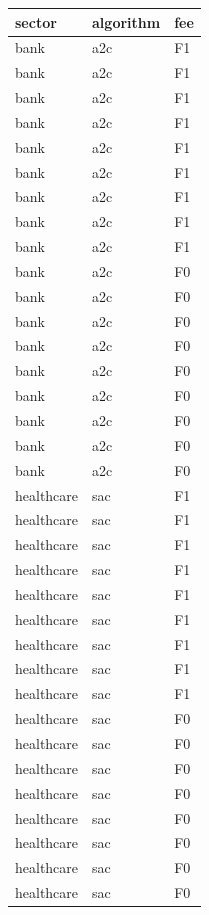 \begin{tabular}{lll}
\toprule
    sector & algorithm & fee \\
\midrule
      bank &       a2c &  F1 \\
      bank &       a2c &  F1 \\
      bank &       a2c &  F1 \\
      bank &       a2c &  F1 \\
      bank &       a2c &  F1 \\
      bank &       a2c &  F1 \\
      bank &       a2c &  F1 \\
      bank &       a2c &  F1 \\
      bank &       a2c &  F1 \\
      bank &       a2c &  F0 \\
      bank &       a2c &  F0 \\
      bank &       a2c &  F0 \\
      bank &       a2c &  F0 \\
      bank &       a2c &  F0 \\
      bank &       a2c &  F0 \\
      bank &       a2c &  F0 \\
      bank &       a2c &  F0 \\
      bank &       a2c &  F0 \\
healthcare &       sac &  F1 \\
healthcare &       sac &  F1 \\
healthcare &       sac &  F1 \\
healthcare &       sac &  F1 \\
healthcare &       sac &  F1 \\
healthcare &       sac &  F1 \\
healthcare &       sac &  F1 \\
healthcare &       sac &  F1 \\
healthcare &       sac &  F1 \\
healthcare &       sac &  F0 \\
healthcare &       sac &  F0 \\
healthcare &       sac &  F0 \\
healthcare &       sac &  F0 \\
healthcare &       sac &  F0 \\
healthcare &       sac &  F0 \\
healthcare &       sac &  F0 \\
healthcare &       sac &  F0 \\

\end{tabular}
